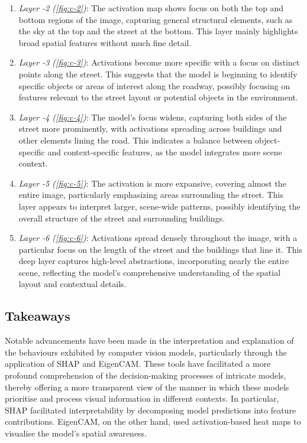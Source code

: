 \begin{enumerate}
    \item \textit{Layer -2 (\ref{fig:c-2})}: The activation map shows focus on both the top and bottom regions of the image, capturing general structural elements, such as the sky at the top and the street at the bottom. This layer mainly highlights broad spatial features without much fine detail.
    \item \textit{Layer -3 (\ref{fig:c-3})}: Activations become more specific with a focus on distinct points along the street. This suggests that the model is beginning to identify specific objects or areas of interest along the roadway, possibly focusing on features relevant to the street layout or potential objects in the environment.
    \item \textit{Layer -4 (\ref{fig:c-4})}: The model's focus widens, capturing both sides of the street more prominently, with activations spreading across buildings and other elements lining the road. This indicates a balance between object-specific and context-specific features, as the model integrates more scene context.
    \item \textit{Layer -5 (\ref{fig:c-5})}: The activation is more expansive, covering almost the entire image, particularly emphasizing areas surrounding the street. This layer appears to interpret larger, scene-wide patterns, possibly identifying the overall structure of the street and surrounding buildings.
    \item \textit{Layer -6 (\ref{fig:c-6})}:  Activations spread densely throughout the image, with a particular focus on the length of the street and the buildings that line it. This deep layer captures high-level abstractions, incorporating nearly the entire scene, reflecting the model's comprehensive understanding of the spatial layout and contextual details.

\end{enumerate}
\newpage
\subsection{Takeaways}\label{subsec:takeaways-and-suggestions-for-future-development}


Notable advancements have been made in the interpretation and explanation of the behaviours exhibited by computer vision models, particularly through the application of SHAP and EigenCAM.
These tools have facilitated a more profound comprehension of the decision-making processes of intricate models, thereby offering a more transparent view of the manner in which these models prioritise and process visual information in different contexts.
In particular, SHAP facilitated interpretability by decomposing model predictions into feature contributions.
EigenCAM, on the other hand, used activation-based heat maps to visualise the model's spatial awareness.

